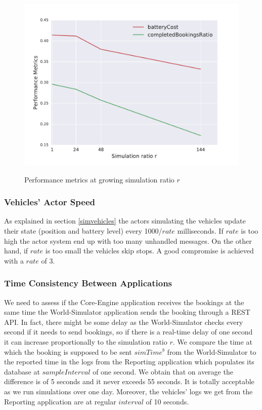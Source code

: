\documentclass[12pt,a4paper]{article}
\begin{document}
\begin{figure}[h] 
  \centering
  \caption{Performance metrics at growing simulation ratio $r$}
  \vspace{-0.5em}
\includegraphics[scale=0.7]{./images/stability.pdf}
\label{fig:stability}
\end{figure}

\subsubsection{Vehicles' Actor Speed} As explained in section \ref{simvehicles} the actors simulating the vehicles update their state (position and battery level) every 1000/$rate$ milliseconds. If $rate$ is too high the actor system end up with too many unhandled messages. On the other hand, if $rate$ is too small the vehicles skip stops. A good compromise is achieved with a $rate$ of 3.

\subsubsection{Time Consistency Between Applications} We need to assess if the Core-Engine application receives the bookings at the same time the World-Simulator application sends the booking through a REST API. In fact, there might be some delay as the World-Simulator checks every second if it needs to send bookings, so if there is a real-time delay of one second it can increase proportionally to the simulation ratio $r$. We compare the time at which the booking is supposed to be sent $simTime^{b}$ from the World-Simulator to the reported time in the logs from the Reporting application which populates its database at $sampleInterval$ of one second. We obtain that on average the difference is of 5 seconds and it never exceeds 55 seconds. It is totally acceptable as we run simulations over one day. Moreover, the vehicles' logs we get from the Reporting application are at regular $interval$ of 10 seconds.
\end{document}
